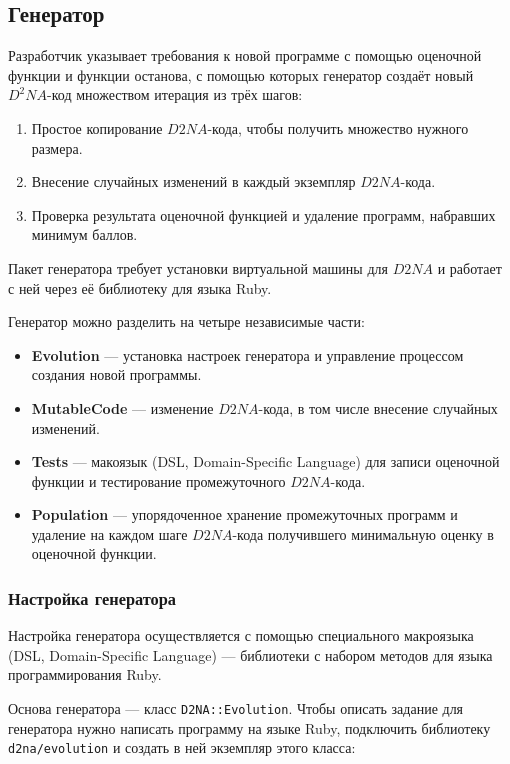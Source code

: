 \documentclass[utf8,a5paper,portrait,10pt,twoside]{eskdtext}
\begin{document}
\newpage
\subsection{Генератор}
Разработчик указывает требования к новой программе с помощью оценочной функции и
функции останова, с помощью которых генератор создаёт новый $D^2NA$-код
множеством итерация из трёх шагов:
\begin{enumerate}
  \item Простое копирование $D2NA$-кода, чтобы получить множество нужного
        размера.
  \item Внесение случайных изменений в каждый экземпляр $D2NA$-кода.
  \item Проверка результата оценочной функцией и удаление программ, набравших
        минимум баллов.
\end{enumerate}

Пакет генератора требует установки виртуальной машины для $D2NA$ и работает с
ней через её библиотеку для языка Ruby.

Генератор можно разделить на четыре независимые части:
\begin{itemize}
  \item \textbf{Evolution} — установка настроек генератора и управление
        процессом создания новой программы.
  \item \textbf{MutableCode} — изменение $D2NA$-кода, в том числе внесение
        случайных изменений.
  \item \textbf{Tests} — макоязык (DSL, Domain-Specific Language) для записи
        оценочной функции и тестирование промежуточного $D2NA$-кода.
  \item \textbf{Population} — упорядоченное хранение промежуточных программ и
        удаление на каждом шаге $D2NA$-кода получившего минимальную оценку в
        оценочной функции.
\end{itemize}

\subsubsection{Настройка генератора}
Настройка генератора осуществляется с помощью специального макроязыка
(DSL, Domain-Specific Language) — библиотеки с набором методов для языка
программирования Ruby.

Основа генератора — класс \texttt{D2NA::Evolution}. Чтобы описать задание для
генератора нужно написать программу на языке Ruby, подключить библиотеку
\texttt{d2na/evolution} и создать в ней экземпляр этого класса:
\end{document}
